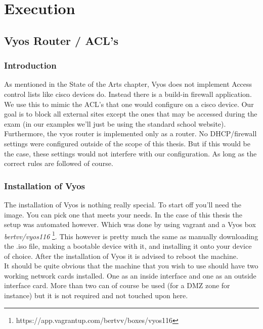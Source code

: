 
\chapter{Execution}
\label{ch:execution}

\section{Vyos Router / ACL's}
\subsection{Introduction}
As mentioned in the State of the Arts chapter, Vyos does not implement Access control lists like cisco devices do. Instead there is a build-in firewall application. We use this to mimic the ACL's that one would configure on a cisco device. Our goal is to block all external sites except the ones that may be accessed during the exam (in our examples we'll just be using the standard school website).\\

 Furthermore, the vyos router is implemented only as a router. No DHCP/firewall settings were configured outside of the scope of this thesis. But if this would be the case, these settings would not interfere with our configuration. As long as the correct rules are followed of course. 
\subsection{Installation of Vyos}
The installation of Vyos is nothing really special. To start off you'll need the image. You can pick one that meets your needs. In the case of this thesis the setup was automated however. Which was done by using vagrant and a Vyos box \textit{bertvv/vyos116} \footnote{ https://app.vagrantup.com/bertvv/boxes/vyos116}. This however is pretty much the same as manually downloading the .iso file, making a bootable device with it, and installing it onto your device of choice. After the installation of Vyos it is advised  to reboot the machine. \\

It should be quite obvious that the machine that you wish to use should have two working network cards installed. One as an inside interface and one as an outside interface card. More than two can of course be used (for a DMZ zone for instance) but it is not required and not touched upon here.
